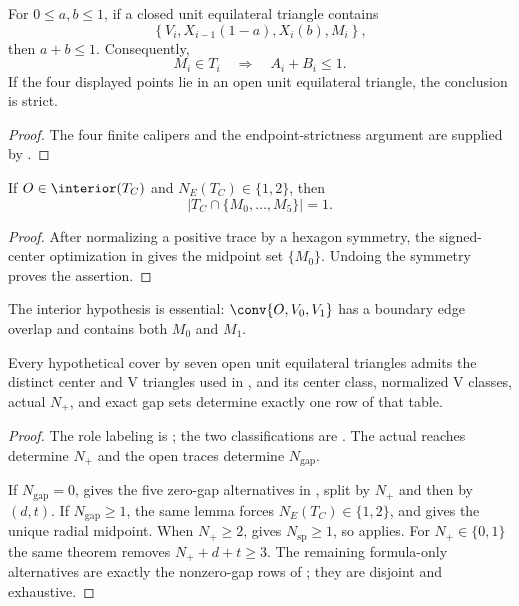 \begin{lemma}
\label{lem:self-midpoint}
For $0\le a,b\le1$, if a closed unit equilateral triangle contains
\[
 \left\{V_i,X_{i-1}(1-a),X_i(b),M_i\right\},
\]
then $a+b\le1$.  Consequently,
\[
 M_i\in T_i\quad\Longrightarrow\quad A_i+B_i\le1.
\]
If the four displayed points lie in an open unit equilateral triangle, the
conclusion is strict.
\end{lemma}

\begin{proof}
The four finite calipers and the endpoint-strictness argument are supplied by
.
\end{proof}

\begin{proposition}
\label{prop:unique-center-midpoint}
If $O\in\interior(T_C)$ and $N_E(T_C)\in\{1,2\}$, then
\[
 \left\lvert T_C\cap\{M_0,\ldots,M_5\}\right\rvert=1.
\]
\end{proposition}

\begin{proof}
After normalizing a positive trace by a hexagon symmetry, the signed-center
optimization in  gives the midpoint set
$\{M_0\}$.  Undoing the symmetry proves the assertion.
\end{proof}

\begin{remark}
The interior hypothesis is essential: $\conv\{O,V_0,V_1\}$ has a boundary
edge overlap and contains both $M_0$ and $M_1$.
\end{remark}

\begin{proposition}
\label{prop:exhaustive-structural-reduction}
Every hypothetical cover by seven open unit equilateral triangles admits the
distinct center and V triangles used in , and its center
class, normalized V classes, actual $N_+$, and exact gap sets determine
exactly one row of that table.
\end{proposition}

\begin{proof}
The role labeling is ; the two classifications are
.  The actual
reaches determine $N_+$ and the open traces determine $N_{\mathrm{gap}}$.

If $N_{\mathrm{gap}}=0$,  gives the five
zero-gap alternatives in , split by $N_+$ and then by
$(d,t)$.  If $N_{\mathrm{gap}}\ge1$, the same lemma forces
$N_E(T_C)\in\{1,2\}$, and  gives the
unique radial midpoint.  When $N_+\ge2$,
 gives $N_{\mathrm{sp}}\ge1$, so
 applies.  For $N_+\in\{0,1\}$ the same
theorem removes $N_++d+t\ge3$.  The remaining formula-only alternatives are
exactly the nonzero-gap rows of ; they are disjoint and
exhaustive.
\end{proof}
